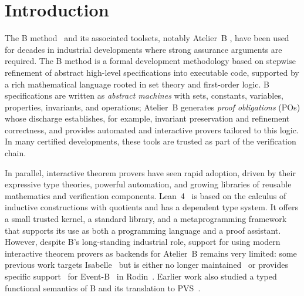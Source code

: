 \section{Introduction}

The B method~\cite{Bmethod} and its associated toolsets, notably Atelier~B \cite{AtelierB}, have been used for decades in industrial developments where strong assurance arguments are required.
The B method is a formal development methodology based on stepwise refinement of abstract high-level specifications into executable code, supported by a rich mathematical language rooted in set theory and first-order logic.
B specifications are written as \emph{abstract machines} with sets, constants, variables, properties, invariants, and operations; Atelier~B generates \emph{proof obligations} (POs) whose discharge establishes, for example, invariant preservation and refinement correctness, and provides automated and interactive provers tailored to this logic.
In many certified developments, these tools are trusted as part of the verification chain.

In parallel, interactive theorem provers have seen rapid adoption, driven by their expressive type theories, powerful automation, and growing libraries of reusable mathematics and verification components.
Lean~4~\cite{lean} is based on the calculus of inductive constructions with quotients and has a dependent type system.
It offers a small trusted kernel, a standard library, and a metaprogramming framework that supports its use as both a programming language and a proof assistant.
However, despite B’s long-standing industrial role, support for using modern interactive theorem provers as backends for Atelier~B remains very limited: some previous work targets Isabelle~\cite{IsabelleHOL} but is either no longer maintained~\cite{Schmalz2012RodinIsabelle} or provides specific support~\cite{Wolff2024EB_Isabelle} for Event-B~\cite{AbrialEventB} in Rodin~\cite{AbrialRodin}.
Earlier work also studied a typed functional semantics of B and its translation to PVS~\cite{Bodeveix2002BtoPVS}.

